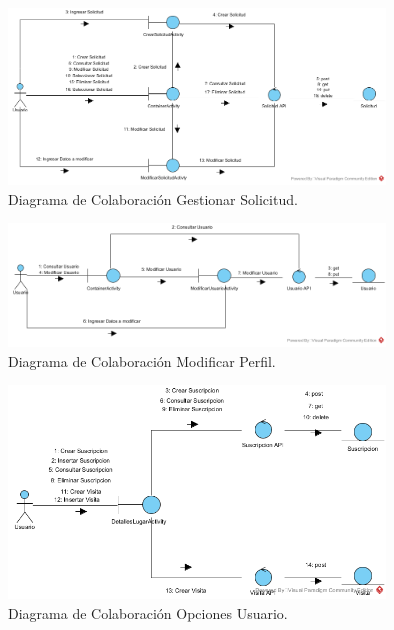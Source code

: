 \documentclass[12pt,letterpaper,openany]{book}
\begin{document}
\begin{figure}[H]
\begin{center}
\includegraphics[width=10cm]{./imagenes/DC/DC_gestionar_solicitud}
\caption{Diagrama de Colaboración Gestionar Solicitud.}
\end{center}
\end{figure}

\begin{figure}[H]
\begin{center}
\includegraphics[width=10cm]{./imagenes/DC/DC_modificar_perfil}
\caption{Diagrama de Colaboración Modificar Perfil.}
\end{center}
\end{figure}

\begin{figure}[H]
\begin{center}
\includegraphics[width=10cm]{./imagenes/DC/DC_opciones_usuario}
\caption{Diagrama de Colaboración Opciones Usuario.}
\end{center}
\end{figure}
\end{document}
